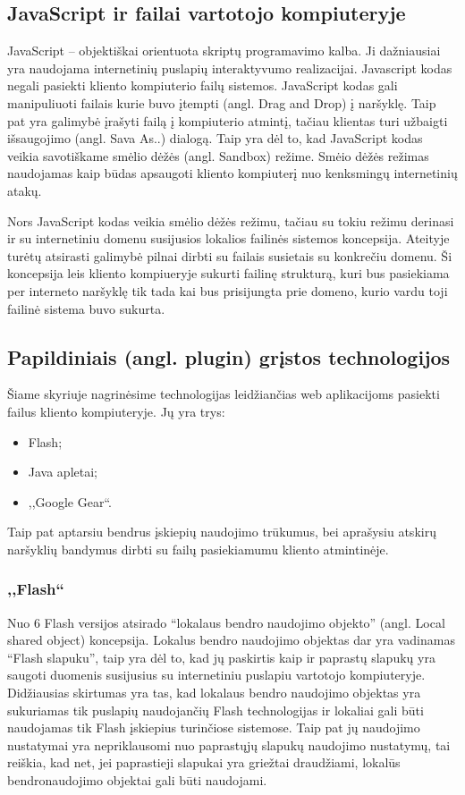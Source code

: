 \documentclass[12pt,a4paper,titlepage]{article}
\begin{document}
\subsection{JavaScript ir failai vartotojo kompiuteryje}

JavaScript – objektiškai orientuota skriptų programavimo kalba. Ji dažniausiai yra naudojama internetinių puslapių interaktyvumo realizacijai. Javascript kodas negali pasiekti kliento kompiuterio failų sistemos. JavaScript kodas gali manipuliuoti failais kurie buvo įtempti (angl. Drag and Drop) į naršyklę. Taip pat yra galimybė įrašyti failą į kompiuterio atmintį, tačiau klientas turi užbaigti išsaugojimo (angl. Sava As..) dialogą. Taip yra dėl to, kad JavaScript kodas veikia savotiškame smėlio dėžės (angl. Sandbox) režime. Smėio dėžės režimas naudojamas kaip būdas apsaugoti kliento kompiuterį nuo kenksmingų internetinių atakų.

Nors JavaScript kodas veikia smėlio dėžės režimu, tačiau su tokiu režimu derinasi ir su internetiniu domenu susijusios lokalios failinės sistemos koncepsija. Ateityje turėtų atsirasti galimybė pilnai dirbti su failais susietais su konkrečiu domenu. Ši koncepsija leis kliento kompiueryje sukurti failinę strukturą, kuri bus pasiekiama per interneto naršyklę tik tada kai bus prisijungta prie domeno, kurio vardu toji failinė sistema buvo sukurta.

\subsection{Papildiniais (angl. plugin) grįstos technologijos}

Šiame skyriuje nagrinėsime technologijas leidžiančias web aplikacijoms pasiekti failus kliento kompiuteryje. Jų yra trys:
\begin{itemize}
  \item Flash;
  \item Java apletai;
  \item ,,Google Gear``.
\end{itemize}

Taip pat aptarsiu bendrus įskiepių naudojimo trūkumus, bei aprašysiu atskirų naršyklių bandymus dirbti su failų pasiekiamumu kliento atmintinėje.

\subsubsection{,,Flash``}

Nuo 6 Flash versijos atsirado “lokalaus bendro naudojimo objekto” (angl. Local shared object) koncepsija. Lokalus bendro naudojimo objektas dar yra vadinamas “Flash slapuku”, taip yra dėl to, kad jų paskirtis kaip ir paprastų slapukų yra saugoti duomenis susijusius su internetiniu puslapiu vartotojo kompiuteryje. Didžiausias skirtumas yra tas, kad lokalaus bendro naudojimo objektas yra sukuriamas tik puslapių naudojančių Flash technologijas ir lokaliai gali būti naudojamas tik Flash įskiepius turinčiose sistemose. Taip pat jų naudojimo nustatymai yra nepriklausomi nuo paprastųjų slapukų naudojimo nustatymų, tai reiškia, kad net, jei paprastieji slapukai yra griežtai draudžiami, lokalūs bendronaudojimo objektai gali būti naudojami. 
\end{document}
